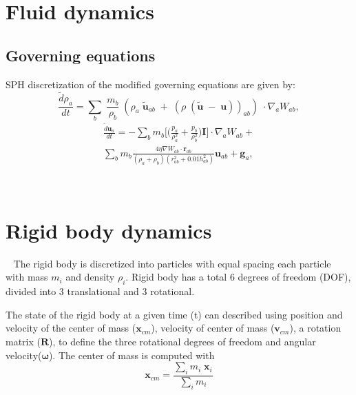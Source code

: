 \documentclass[preprint,12pt]{elsarticle}
\newcommand{\todoin}{\todo[inline]}
\newcommand{\teng}[1]{\ensuremath{\boldsymbol{#1}}}
\newcommand{\ten}[1]{\ensuremath{\mathbf{#1}}}
\begin{document}
\FloatBarrier%
\section{Fluid dynamics}
\label{sec:fluid-dynamics}

\todoin{Connor FSI}

\subsection{Governing equations}
\label{sec:governing-eqns-fluid-dynamics}

SPH discretization of the modified governing equations are given by:
\begin{equation}
  \label{eq:sph-discretization-continuity}
  \frac{\tilde{d}\rho_a}{dt} = \sum_{b} \; \frac{m_b}{\rho_{b}} \; (
  \rho_{a} \; \tilde{\ten{u}}_{ab} \; + \;
  (\rho \; (\tilde{\ten{u}} \; - \;
  \ten{u}))_{ab}) \; \cdot \nabla_{a} W_{ab},
\end{equation}
\begin{multline}
  \label{eq:sph-momentum-fluid}
  \frac{\tilde{d}\ten{u}_{a}}{dt} = - \sum_{b} m_b \bigg[
  \bigg(\frac{p_a}{\rho_a^2} + \frac{p_b}{\rho_b^2}\bigg) \ten{I}
   \bigg]
  \cdot \nabla_{a} W_{ab} + \\
  \sum_{b} m_b \frac{4 \eta \nabla W_{ab}\cdot
    \ten{r}_{ab}}{(\rho_a + \rho_b) (r_{ab}^2 + 0.01 h_{ab}^2)} \ten{u}_{ab} +
  \ten{g}_{a},
\end{multline}


\newpage
~\newpage
~\newpage


\FloatBarrier%
\section{Rigid body dynamics}
\label{sec:rbd}

\newpage
~\newpage
The rigid body is discretized into particles with equal spacing each particle
with mass $m_i$ and density $\rho_i$. Rigid body has a total 6 degrees of
freedom (DOF), divided into $3$ translational and $3$ rotational.

The state of the rigid body at a given time (t) can described using position
and velocity of the center of mass ($\ten{x}_{cm}$), velocity of center of
mass ($\ten{v}_{cm}$), a rotation matrix ($\ten{R}$), to define the three
rotational degrees of freedom and angular velocity($\teng{\omega}$). The
center of mass is computed with
\begin{equation}
  \label{eq:center_of_mass}
  \ten{x}_{cm} = \frac{\sum_i m_i \; \ten{x}_{i} }{\sum_i m_i }
\end{equation}
\end{document}
